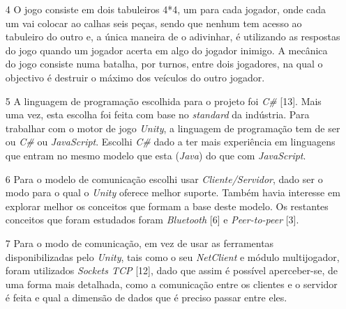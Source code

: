 \begin{enumerate}
\item[4] O jogo consiste em dois tabuleiros 4*4, um para cada jogador, onde cada um vai colocar ao calhas seis peças, sendo que nenhum tem acesso ao tabuleiro do outro e, a única maneira de o adivinhar, é utilizando as respostas do jogo quando um jogador acerta em algo do jogador inimigo. A mecânica do jogo consiste numa batalha, por turnos, entre dois jogadores, na qual o objectivo é destruir o máximo dos veículos do outro jogador.

\item[5] A linguagem de programação escolhida para o projeto foi \emph{C\#} [13]. Mais uma vez, esta escolha foi feita com base no \textit{standard} da indústria. Para trabalhar com o motor de jogo \emph{Unity}, a linguagem de programação tem de ser ou \emph{C\#} ou \emph{JavaScript}. Escolhi \emph{C\#} dado a ter mais experiência em linguagens que entram no mesmo modelo que esta (\emph{Java}) do que com \emph{JavaScript}.

\item[6] Para o modelo de comunicação escolhi usar \emph{Cliente/Servidor}, dado ser o modo para o qual o \emph{Unity} oferece melhor suporte. Também havia interesse em explorar melhor os conceitos que formam a base deste modelo. Os restantes conceitos que foram estudados foram \textit{Bluetooth} [6] e \textit{Peer-to-peer} [3].

\item[7] Para o modo de comunicação, em vez de usar as ferramentas disponibilizadas pelo \emph{Unity}, tais como o seu \emph{NetClient} e módulo multijogador, foram utilizados \emph{Sockets \ac{TCP}} [12], dado que assim é possível aperceber-se, de uma forma mais detalhada, como a comunicação entre os clientes e o servidor é feita e qual a dimensão de dados que é preciso passar entre eles.
\end{enumerate}
\clearpage

